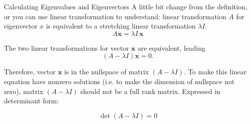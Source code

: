\documentclass{beamer}
\begin{document}
\begin{frame}{Calculating Eigenvalues and Eigenvectors}
A little bit change from the definition, or you can use linear transformation to understand: linear transformation $A$ for eigenvector $x$ is equivalent to a stretching linear transformation $\lambda I$.
\begin{equation*}
    A \mathbf{x}=\lambda I \,\mathbf{x}
\end{equation*}

The two linear transformations for vector $\mathbf{x}$ are equivalent, leading
\begin{equation*}
    \left(A-\lambda I \right) \mathbf{x}=0.
\end{equation*}

Therefore, vector $\mathbf{x}$ is in the nullspace of matrix $\left(A-\lambda I \right)$. To make this linear equation have nonzero solutions (i.e. to make the dimension of nullspace not zero), matrix $\left(A-\lambda I \right)$ should not be a full rank matrix. Expressed in determinant form:

\begin{equation*}
    \det \left( A-\lambda I \right) =0
\end{equation*}
\end{frame}
\end{document}
